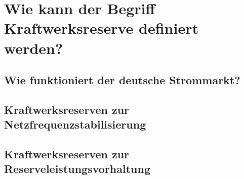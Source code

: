 \section{Wie kann der Begriff Kraftwerksreserve definiert werden?}

		

	\subsection{Wie funktioniert der deutsche Strommarkt?}
	
		
	
	\subsection{Kraftwerksreserven zur Netzfrequenzstabilisierung}
	
		
	
	\subsection{Kraftwerksreserven zur Reserveleistungsvorhaltung}
